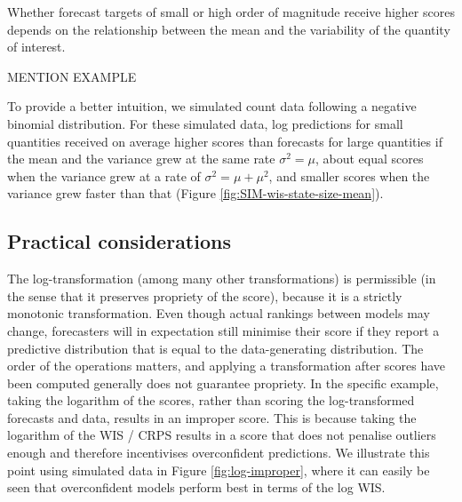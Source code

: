 \documentclass{article}
\begin{document}
Whether forecast targets of small or high order of magnitude receive higher scores depends on the relationship between the mean and the variability of the quantity of interest. 

MENTION EXAMPLE


To provide a better intuition, we simulated count data following a negative binomial distribution. For these simulated data, log predictions for small quantities received on average higher scores than forecasts for large quantities if the mean and the variance grew at the same rate $\sigma^2 = \mu$, about equal scores when the variance grew at a rate of $\sigma^2 = \mu + \mu^2$, and smaller scores when the variance grew faster than that (Figure \ref{fig:SIM-wis-state-size-mean}). 

\subsection{Practical considerations}
\label{sec:methods:considerations}

The log-transformation (among many other transformations) is permissible (in the sense that it preserves propriety of the score), because it is a strictly monotonic transformation. Even though actual rankings between models may change, forecasters will in expectation still minimise their score if they report a predictive distribution that is equal to the data-generating distribution. The order of the operations matters, and applying a transformation after scores have been computed generally does not guarantee propriety. In the specific example, taking the logarithm of the scores, rather than scoring the log-transformed forecasts and data, results in an improper score. This is because taking the logarithm of the WIS / CRPS results in a score that does not penalise outliers enough and therefore incentivises overconfident predictions. We illustrate this point using simulated data in Figure \ref{fig:log-improper}, where it can easily be seen that overconfident models perform best in terms of the log WIS. 
\end{document}

